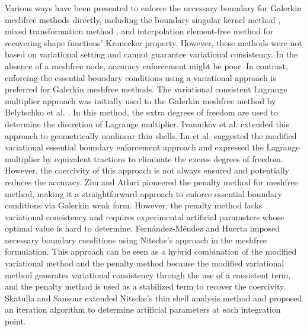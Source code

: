 Various ways have been presented to enforce the necessary boundary for Galerkin meshfree methods directly, including the boundary singular kernel method \cite{chen2000a}, mixed transformation method  \cite{chen2000a}, and interpolation element-free method \cite{liu2019a} for recovering shape functions’ Kronecker property. However, these methods were not based on variational setting and cannot guarantee variational consistency. In the absence of a meshfree node, accuracy enforcement might be poor. In contrast, enforcing the essential boundary conditions using a variational approach is preferred for Galerkin meshfree methods. The variational consistent Lagrange multiplier approach was initially used to the Galerkin meshfree method by Belytschko et al. \cite{belytschko1994}. In this method, the extra degrees of freedom are used to determine the discretion of Lagrange multiplier. Ivannikov et al. \cite{ivannikov2014a} extended this approach to geometrically nonlinear thin shells. Lu et al. \cite{lu1994} suggested the modified variational essential boundary enforcement approach and expressed the Lagrange multiplier by equivalent tractions to eliminate the excess degrees of freedom. However, the coercivity of this approach is not always ensured and potentially reduces the accuracy. Zhu and Atluri \cite{zhu1998} pioneered the penalty method for meshfree method, making it a straightforward approach to enforce essential boundary conditions via Galerkin weak form. However, the penalty method lacks variational consistency and requires experimental artificial parameters whose optimal value is hard to determine. Fernández-Méndez and Huerta \cite{fernandez-mendez2004} imposed necessary boundary conditions using Nitsche's approach in the meshfree formulation. This approach can be seen as a hybrid combination of the modified variational method and the penalty method because the modified variational method generates variational consistency through the use of a consistent term, and the penalty method is used as a stabilized term to recover the coercivity. Skatulla and Sansour \cite{skatulla2008} extended Nitsche’s thin shell analysis method and proposed an iteration algorithm to determine artificial parameters at each integration point.

